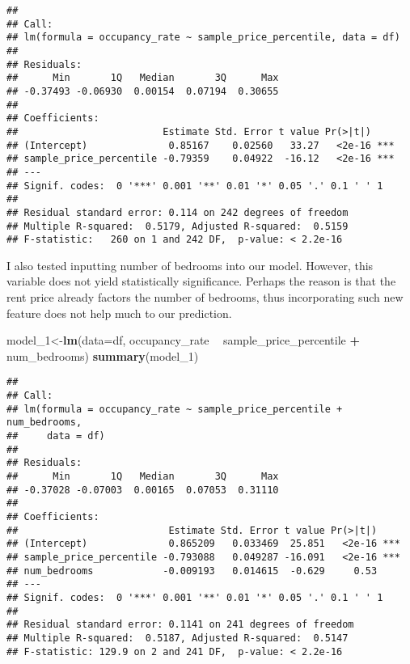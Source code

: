 \documentclass[]{article}
\newenvironment{Shaded}{\begin{snugshade}}{\end{snugshade}}
\newcommand{\DataTypeTok}[1]{\textcolor[rgb]{0.13,0.29,0.53}{#1}}
\newcommand{\DecValTok}[1]{\textcolor[rgb]{0.00,0.00,0.81}{#1}}
\newcommand{\KeywordTok}[1]{\textcolor[rgb]{0.13,0.29,0.53}{\textbf{#1}}}
\newcommand{\NormalTok}[1]{#1}
\newcommand{\OperatorTok}[1]{\textcolor[rgb]{0.81,0.36,0.00}{\textbf{#1}}}
\newcommand{\StringTok}[1]{\textcolor[rgb]{0.31,0.60,0.02}{#1}}
\begin{document}
\begin{verbatim}
## 
## Call:
## lm(formula = occupancy_rate ~ sample_price_percentile, data = df)
## 
## Residuals:
##      Min       1Q   Median       3Q      Max 
## -0.37493 -0.06930  0.00154  0.07194  0.30655 
## 
## Coefficients:
##                         Estimate Std. Error t value Pr(>|t|)    
## (Intercept)              0.85167    0.02560   33.27   <2e-16 ***
## sample_price_percentile -0.79359    0.04922  -16.12   <2e-16 ***
## ---
## Signif. codes:  0 '***' 0.001 '**' 0.01 '*' 0.05 '.' 0.1 ' ' 1
## 
## Residual standard error: 0.114 on 242 degrees of freedom
## Multiple R-squared:  0.5179, Adjusted R-squared:  0.5159 
## F-statistic:   260 on 1 and 242 DF,  p-value: < 2.2e-16
\end{verbatim}

I also tested inputting number of bedrooms into our model. However, this
variable does not yield statistically significance. Perhaps the reason
is that the rent price already factors the number of bedrooms, thus
incorporating such new feature does not help much to our prediction.

\begin{Shaded}
\begin{Highlighting}[]
\NormalTok{model_}\DecValTok{1}\NormalTok{<-}\KeywordTok{lm}\NormalTok{(}\DataTypeTok{data=}\NormalTok{df, occupancy_rate }\OperatorTok{~}\StringTok{ }\NormalTok{sample_price_percentile }\OperatorTok{+}\StringTok{ }\NormalTok{num_bedrooms)}
\KeywordTok{summary}\NormalTok{(model_}\DecValTok{1}\NormalTok{)}
\end{Highlighting}
\end{Shaded}

\begin{verbatim}
## 
## Call:
## lm(formula = occupancy_rate ~ sample_price_percentile + num_bedrooms, 
##     data = df)
## 
## Residuals:
##      Min       1Q   Median       3Q      Max 
## -0.37028 -0.07003  0.00165  0.07053  0.31110 
## 
## Coefficients:
##                          Estimate Std. Error t value Pr(>|t|)    
## (Intercept)              0.865209   0.033469  25.851   <2e-16 ***
## sample_price_percentile -0.793088   0.049287 -16.091   <2e-16 ***
## num_bedrooms            -0.009193   0.014615  -0.629     0.53    
## ---
## Signif. codes:  0 '***' 0.001 '**' 0.01 '*' 0.05 '.' 0.1 ' ' 1
## 
## Residual standard error: 0.1141 on 241 degrees of freedom
## Multiple R-squared:  0.5187, Adjusted R-squared:  0.5147 
## F-statistic: 129.9 on 2 and 241 DF,  p-value: < 2.2e-16
\end{verbatim}
\end{document}
